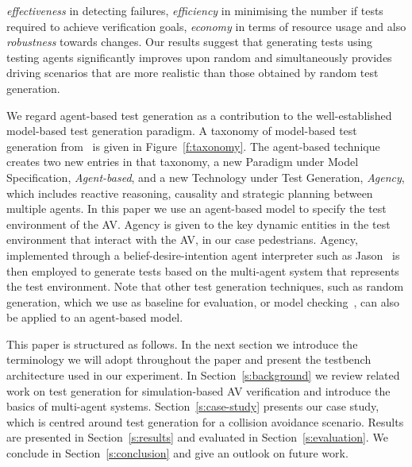 \documentclass[letterpaper, 10 pt, journal, twoside]{IEEEtran}
\begin{document}
%
%
\textit{effectiveness} in detecting failures, 
\textit{efficiency} in minimising the number if tests required to achieve verification goals, 
\textit{economy} in terms of resource usage %
and also 
\textit{robustness} towards changes. 
%
Our results suggest that generating tests using testing agents significantly improves upon random and simultaneously provides driving scenarios that are more realistic than those obtained by random test generation.

We regard agent-based test generation as a contribution to the well-established model-based test generation paradigm. A taxonomy of model-based test generation from~\cite{utting2012taxonomy} is given in Figure~\ref{f:taxonomy}.
%
The agent-based technique creates two new entries in that taxonomy, a new Paradigm under Model Specification, \textit{Agent-based}, and a new Technology under Test Generation, \textit{Agency}, which includes reactive reasoning, causality and strategic planning between multiple agents.
%
In this paper we use an agent-based model to specify the test environment of the AV. Agency is given to the key dynamic entities in the test environment that interact with the AV, in our case pedestrians. Agency, implemented through a belief-desire-intention agent interpreter such as Jason~\cite{bordini2005jason} is then employed to generate tests based on the multi-agent system that represents the test environment. Note that other test generation techniques, such as random generation, which we use as baseline for evaluation, or model checking~\cite{Bordini2006}, can also be applied to an agent-based model.	

This paper is structured as follows. In the next section we introduce the terminology we will adopt throughout the paper and present the testbench architecture used in our experiment. In Section~\ref{s:background} we review related work on test generation for simulation-based AV verification and introduce the basics of multi-agent systems. Section~\ref{s:case-study} presents our case study, which is centred around test generation for a collision avoidance scenario. Results are presented in Section~\ref{s:results} and evaluated in Section~\ref{s:evaluation}. We conclude in Section~\ref{s:conclusion} and give an outlook on future work. 
\end{document}
